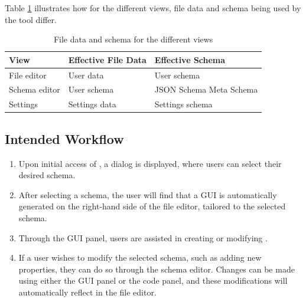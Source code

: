 Table \ref{tab:schema_and_file_data_by_mode} illustrates how for the different views, file data and schema being used by the tool differ.
\begin{table}[!t]
\caption{File data and schema for the different views}
\label{tab:schema_and_file_data_by_mode}
\centering
\begin{tabular}{lll}
\toprule
\textbf{View} & \textbf{Effective File Data} & \textbf{Effective Schema} \\
\midrule
File editor   & User data                    & User schema               \\
Schema editor & User schema                  & JSON Schema Meta Schema          \\
Settings      & Settings data                & Settings schema           \\
\bottomrule
\end{tabular}
\end{table}


\subsection{Intended Workflow}\label{subsec:workflow} %
\begin{enumerate}
    \item Upon initial access of \toolname{}, a dialog is displayed, where users can select their desired schema.
    \item After selecting a schema, the user will find that a GUI is automatically generated on the right-hand side of the file editor,
    tailored to the selected schema.
    \item Through the GUI panel, users are assisted in creating or modifying \cfgfiles{}.
    \item If a user wishes to modify the selected schema, such as adding new properties, they can do so through the schema editor.
    Changes can be made using either the GUI panel or the code panel, and these modifications will automatically reflect in the file editor.
\end{enumerate}





